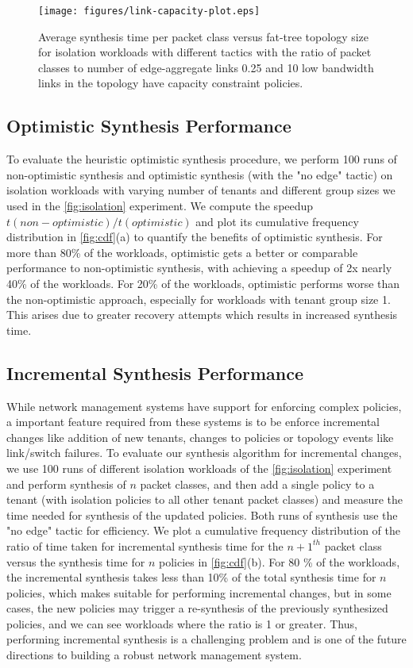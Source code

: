\begin{figure}[h]
	\texttt{[image: figures/link-capacity-plot.eps]}
	\caption{Average synthesis time per packet class versus fat-tree topology size for isolation workloads 
		with different tactics with the ratio of packet classes to number of edge-aggregate links 0.25 and 10 low bandwidth links in the topology 
		have capacity constraint policies.}
	\label{fig:link-capacity}
\end{figure}


\subsection{Optimistic Synthesis Performance} \label{sec:optimisticeval}
To evaluate the heuristic optimistic synthesis procedure, we perform 100 runs of non-optimistic
 synthesis and optimistic synthesis (with the "no edge" tactic) on isolation
 workloads with varying number of tenants and different group sizes 
we used in the \cref{fig:isolation} experiment. We compute the
 speedup $t(non-optimistic)/t(optimistic)$ and plot its cumulative frequency
  distribution in \cref{fig:cdf}(a) to quantify the benefits of optimistic 
  synthesis. For more than 80\% of the
workloads, optimistic gets a better or comparable performance to non-optimistic synthesis, with
achieving a speedup of 2x nearly 40\% of the workloads. For 20\% of the workloads, optimistic
performs worse than the non-optimistic approach, especially for workloads with tenant group size 1. 
This arises due to greater recovery attempts which results in increased synthesis time. 

\subsection{Incremental Synthesis Performance} \label{sec:incrementaleval}
While network management systems have support for enforcing complex policies, 
a important feature required from these systems is to be enforce incremental changes
like addition of new tenants, changes to policies or topology events like link/switch 
failures. To evaluate our synthesis algorithm for incremental changes, we use 100 runs of 
different isolation workloads of the \cref{fig:isolation} experiment and perform synthesis
of $n$ packet classes, and then
add a single policy to a tenant (with isolation policies to all other tenant packet classes) and
measure the time needed for synthesis of the updated policies. Both runs of synthesis use the
"no edge" tactic for efficiency. We plot a cumulative frequency 
distribution of the ratio of time taken for incremental synthesis time for the $n+1^{th}$ packet class
 versus the synthesis time for $n$ policies  in \cref{fig:cdf}(b). For 80 \% of the workloads, the incremental 
synthesis takes less than 10\% of the total synthesis time for $n$ policies, which makes \Name suitable for 
performing incremental changes, but in some cases, the new policies may trigger a re-synthesis 
of the previously synthesized policies, and we can see workloads where the ratio is 1 or greater. 
Thus, performing incremental synthesis is a challenging problem and is one of the future directions
to building a robust network management system. 

